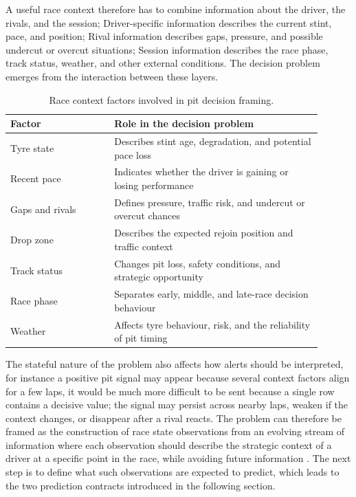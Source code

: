 A useful race context therefore has to combine information about the driver, the rivals, and the session;
Driver-specific information describes the current stint, pace, and position;
Rival information describes gaps, pressure, and possible undercut or overcut situations;
Session information describes the race phase, track status, weather, and other external conditions.
The decision problem emerges from the interaction between these layers.

\begin{table}[t]
    \centering
    \renewcommand{\arraystretch}{1.35}
    \caption{Race context factors involved in pit decision framing.}
    \label{tab:race_context_factors}
    \begin{tabular}{p{0.30\linewidth}p{0.60\linewidth}}
        \toprule
        Factor          & Role in the decision problem                                    \\
        \midrule
        Tyre state      & Describes stint age, degradation, and potential pace loss       \\
        Recent pace     & Indicates whether the driver is gaining or losing performance   \\
        Gaps and rivals & Defines pressure, traffic risk, and undercut or overcut chances \\
        Drop zone       & Describes the expected rejoin position and traffic context      \\
        Track status    & Changes pit loss, safety conditions, and strategic opportunity  \\
        Race phase      & Separates early, middle, and late-race decision behaviour       \\
        Weather         & Affects tyre behaviour, risk, and the reliability of pit timing \\
        \bottomrule
    \end{tabular}
\end{table}
\FloatBarrier


The stateful nature of the problem also affects how alerts should be interpreted, for instance
a positive pit signal may appear because several context factors align for a few laps, it would be much more difficult to be sent because a single row contains a decisive value;
the signal may persist across nearby laps, weaken if the context changes, or disappear after a rival reacts.
The problem can therefore be framed as the construction of race state observations from an evolving stream of information where
each observation should describe the strategic context of a driver at a specific point in the race, while avoiding future information \citep{akidau2015dataflow,brookshire2024leakage}.
The next step is to define what such observations are expected to predict, which leads to the two prediction contracts introduced in the following section.

